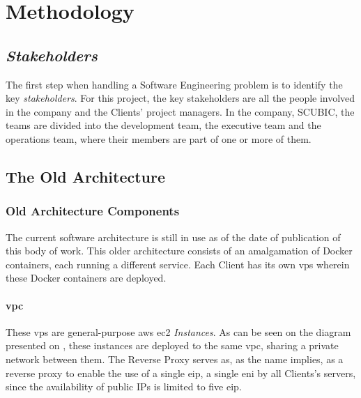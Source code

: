 \chapter{Methodology}\label{methodology}

\section{\textit{Stakeholders}}\label{methodology:s:stakeholders}

The first step when handling a Software Engineering problem is to identify the key \textit{stakeholders}. For this project, the key stakeholders are all the people involved in the company and the Clients' project managers. In the company, SCUBIC, the teams are divided into the development team, the executive team and the operations team, where their members are part of one or more of them.

\section{The Old Architecture}\label{methodology:s:the-old-architecture}

\subsection{Old Architecture Components }\label{methodology:ss:current-architecture}

The current software architecture is still in use as of the date of publication of this body of work. This older architecture consists of an amalgamation of Docker containers, each running a different service. Each Client has its own \gls{vps} wherein these Docker containers are deployed. 

\subsubsection{\gls{vpc}}\label{methodology:sss:vpc}

These \gls{vps} are general-purpose \gls{aws} \gls{ec2} \textit{Instances}. As can be seen on the diagram presented on , these instances are deployed to the same \gls{vpc}, sharing a private network between them. The Reverse Proxy serves as, as the name implies, as a reverse proxy to enable the use of a single \gls{eip}, a single \gls{eni} by all Clients's servers, since the availability of public IPs is limited to five \gls{eip}.



